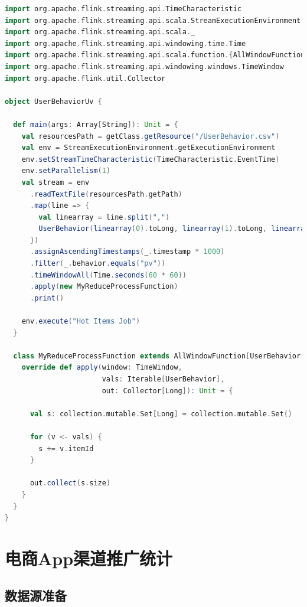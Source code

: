 \documentclass[oneside]{ctexbook}
\begin{document}
\begin{lstlisting}[language=scala]
import org.apache.flink.streaming.api.TimeCharacteristic
import org.apache.flink.streaming.api.scala.StreamExecutionEnvironment
import org.apache.flink.streaming.api.scala._
import org.apache.flink.streaming.api.windowing.time.Time
import org.apache.flink.streaming.api.scala.function.{AllWindowFunction, ProcessAllWindowFunction}
import org.apache.flink.streaming.api.windowing.windows.TimeWindow
import org.apache.flink.util.Collector

object UserBehaviorUv {

  def main(args: Array[String]): Unit = {
    val resourcesPath = getClass.getResource("/UserBehavior.csv")
    val env = StreamExecutionEnvironment.getExecutionEnvironment
    env.setStreamTimeCharacteristic(TimeCharacteristic.EventTime)
    env.setParallelism(1)
    val stream = env
      .readTextFile(resourcesPath.getPath)
      .map(line => {
        val linearray = line.split(",")
        UserBehavior(linearray(0).toLong, linearray(1).toLong, linearray(2).toInt, linearray(3), linearray(4).toLong)
      })
      .assignAscendingTimestamps(_.timestamp * 1000)
      .filter(_.behavior.equals("pv"))
      .timeWindowAll(Time.seconds(60 * 60))
      .apply(new MyReduceProcessFunction)
      .print()

    env.execute("Hot Items Job")
  }

  class MyReduceProcessFunction extends AllWindowFunction[UserBehavior, Long, TimeWindow] {
    override def apply(window: TimeWindow,
                       vals: Iterable[UserBehavior],
                       out: Collector[Long]): Unit = {

      val s: collection.mutable.Set[Long] = collection.mutable.Set()

      for (v <- vals) {
        s += v.itemId
      }

      out.collect(s.size)
    }
  }
}
\end{lstlisting}

\section{电商App渠道推广统计}

\subsection{数据源准备}
\end{document}
